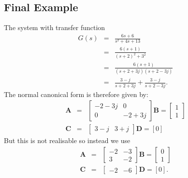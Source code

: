 \subsection*{Final Example}
 The system with transfer function
\begin{eqnarray*}G(s) &=& \frac{6s+6}{s^2 + 4s + 13}\\
&=& \frac{6(s+1)}{(s+2)^2 + 3^2} \\ &=&
\frac{6(s+1)}{(s+2+3j)(s+2-3j)}
\\ &=& \frac{3-j}{s+2+3j} + \frac{3-j}{s+2-3j}.\end{eqnarray*} The normal canonical form is
therefore given by:
\begin{eqnarray*}
\mathbf{A} &=& \left[\begin{array}{cc}
  -2-3j & 0 \\
  0 & -2+3j
\end{array}\right] \mathbf{B} = \left[\begin{array}{c}
  1 \\
  1
\end{array}\right]\\ \mathbf{C} &=& \left[\begin{array}{cc}
  3-j & 3+j
\end{array}\right] \mathbf{D} = \left[0\right]
\end{eqnarray*}
But this is not realisable so instead we use
\begin{eqnarray*}
\mathbf{A} &=& \left[\begin{array}{cc}
  -2 & -3 \\
  3 & -2
\end{array}\right] \mathbf{B} = \left[\begin{array}{c}
  0 \\
  1
\end{array}\right]\\ \mathbf{C} &=& \left[\begin{array}{cc}
  -2 & -6
\end{array}\right] \mathbf{D} = \left[0\right].
\end{eqnarray*}



\endinput

